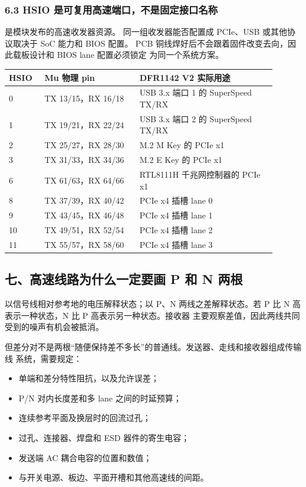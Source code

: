 \subsubsection{6.3 HSIO 是可复用高速端口，不是固定接口名称}

是模块发布的高速收发器资源。
同一组收发器能否配置成 PCIe、USB 或其他协议取决于 SoC 能力和 BIOS 配置。
PCB 铜线焊好后不会跟着固件改变去向，因此载板设计和 BIOS lane 配置必须锁定
为同一个系统方案。

\begin{longtable}{L{0.12\linewidth}L{0.32\linewidth}L{0.46\linewidth}}
\toprule
HSIO & Mu 物理 pin & DFR1142 V2 实际用途 \\
 & TX 13/15，RX 16/18 & USB 3.x 端口 1 的 SuperSpeed TX/RX \\
1 & TX 19/21，RX 22/24 & USB 3.x 端口 2 的 SuperSpeed TX/RX \\
2 & TX 25/27，RX 28/30 & M.2 M Key 的 PCIe x1 \\
3 & TX 31/33，RX 34/36 & M.2 E Key 的 PCIe x1 \\
6 & TX 61/63，RX 64/66 & RTL8111H 千兆网控制器的 PCIe x1 \\
8 & TX 37/39，RX 40/42 & PCIe x4 插槽 lane 0 \\
9 & TX 43/45，RX 46/48 & PCIe x4 插槽 lane 1 \\
10 & TX 49/51，RX 52/54 & PCIe x4 插槽 lane 2 \\
11 & TX 55/57，RX 58/60 & PCIe x4 插槽 lane 3 \\
\bottomrule
\end{longtable}

\subsection{七、高速线路为什么一定要画 P 和 N 两根}

以信号线相对参考地的电压解释状态；以 P、N
两线之差解释状态。若 P 比 N 高表示一种状态，N 比 P 高表示另一种状态。接收器
主要观察差值，因此两线共同受到的噪声有机会被抵消。

但差分对不是两根“随便保持差不多长”的普通线。发送器、走线和接收器组成传输线
系统，需要规定：

\begin{itemize}[leftmargin=2em]
  \item 单端和差分特性阻抗，以及允许误差；
  \item P/N 对内长度差和多 lane 之间的时延预算；
  \item 连续参考平面及换层时的回流过孔；
  \item 过孔、连接器、焊盘和 ESD 器件的寄生电容；
  \item 发送端 AC 耦合电容的位置和数值；
  \item 与开关电源、板边、平面开槽和其他高速线的间距。
\end{itemize}

